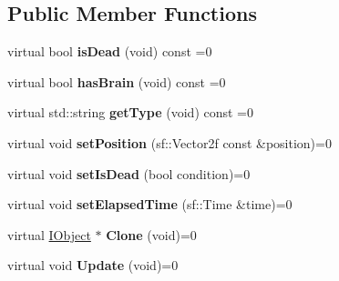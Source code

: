 \subsection*{Public Member Functions}
\begin{DoxyCompactItemize}
\item 
\hypertarget{class_graphics_1_1_i_object_a8efbdb791e3a99d697e5c74a1531d2c8}{}virtual bool {\bfseries is\+Dead} (void) const  =0\label{class_graphics_1_1_i_object_a8efbdb791e3a99d697e5c74a1531d2c8}

\item 
\hypertarget{class_graphics_1_1_i_object_a2915106368247427dcff04c5eec2190c}{}virtual bool {\bfseries has\+Brain} (void) const  =0\label{class_graphics_1_1_i_object_a2915106368247427dcff04c5eec2190c}

\item 
\hypertarget{class_graphics_1_1_i_object_a9ca3ca5527c0c565d06396efe80ba243}{}virtual std\+::string {\bfseries get\+Type} (void) const  =0\label{class_graphics_1_1_i_object_a9ca3ca5527c0c565d06396efe80ba243}

\item 
\hypertarget{class_graphics_1_1_i_object_acb10bc8924396f1e9a8aa510e96ec0c2}{}virtual void {\bfseries set\+Position} (sf\+::\+Vector2f const \&position)=0\label{class_graphics_1_1_i_object_acb10bc8924396f1e9a8aa510e96ec0c2}

\item 
\hypertarget{class_graphics_1_1_i_object_a55f6f70a2c0c2690b6b6a78a75ece3fb}{}virtual void {\bfseries set\+Is\+Dead} (bool condition)=0\label{class_graphics_1_1_i_object_a55f6f70a2c0c2690b6b6a78a75ece3fb}

\item 
\hypertarget{class_graphics_1_1_i_object_af8866f1765a721c230556bfa391d0299}{}virtual void {\bfseries set\+Elapsed\+Time} (sf\+::\+Time \&time)=0\label{class_graphics_1_1_i_object_af8866f1765a721c230556bfa391d0299}

\item 
\hypertarget{class_graphics_1_1_i_object_a1f863b90e0b37e462c487731cc218fdd}{}virtual \hyperlink{class_graphics_1_1_i_object}{I\+Object} $\ast$ {\bfseries Clone} (void)=0\label{class_graphics_1_1_i_object_a1f863b90e0b37e462c487731cc218fdd}

\item 
\hypertarget{class_graphics_1_1_i_object_a45b5308a10381dd4f41faeef2d06f46c}{}virtual void {\bfseries Update} (void)=0\label{class_graphics_1_1_i_object_a45b5308a10381dd4f41faeef2d06f46c}

\end{DoxyCompactItemize}
